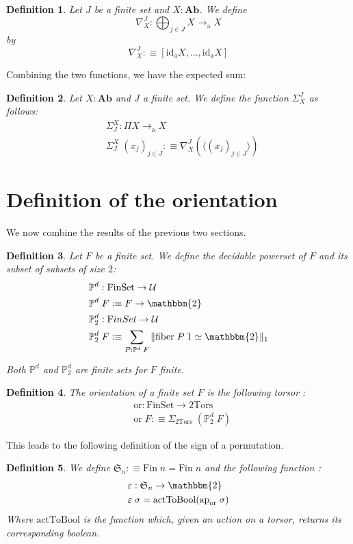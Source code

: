 \documentclass{article}
\newtheorem{defi}{Definition}
\newcommand{\toa}[0]{\to_\mathrm a}
\newcommand{\btwo}[0]{\mathbbm{2}}
\newcommand{\twotors}[0]{2\mathrm{Tors}}
\newcommand{\idd}[0]{\mathrm{id}}
\begin{document}
\begin{defi}
    Let $J$ be a finite set and $X : \textbf{Ab}$. We define $$\nabla^J_X : \bigoplus_{j\in J} X \toa X$$ by
    $$\nabla^J_X :\equiv [\idd_\mathrm a X,\ldots,\idd_\mathrm a X]$$
\end{defi}

Combining the two functions, we have the expected sum:

\begin{defi}
    Let $X : \textbf{Ab}$ and $J$ a finite set. We define the function $\Sigma^J_X$ as follows:
    \begin{align*}
        &\Sigma_J^X : \Pi X \toa X\\
        &\Sigma_J^X\;(x_j)_{j\in J} :\equiv \nabla^J_X (\langle (x_j)_{j\in J}\rangle)
    \end{align*}
\end{defi}

\section{Definition of the orientation}

We now combine the results of the previous two sections.

\begin{defi}
    Let $F$ be a finite set. We define the decidable powerset of $F$ and its subset of subsets of size $2$:
    \begin{align*}
        &\mathbb P^d : \mathrm{FinSet} \to \mathcal U\\
        &\mathbb P^d\;F :\equiv F \to \btwo\\
        &\mathbb P^d_2 : \mathrm FinSet \to \mathcal U\\
        &\mathbb P^d_2\;F :\equiv \sum_{P : \mathbb P^d\;F} \| \mathrm{fiber}\;P\;1 \simeq \btwo\|_1
    \end{align*}

    Both $\mathbb P^d$ and $\mathbb P^d_2$ are finite sets for $F$ finite.
\end{defi}

\begin{defi}
    The orientation of a finite set $F$ is the following torsor :
    \begin{align*}
        &\mathrm{or} : \mathrm{FinSet} \to \twotors\\
        &\mathrm{or}\;F :\equiv \Sigma_{\twotors}\;(\mathbb P^d_2\;F)
    \end{align*}
\end{defi}

This leads to the following definition of the sign of a permutation.

\begin{defi}
    We define $\mathfrak S_n :\equiv \mathrm{Fin}\;n = \mathrm{Fin}\;n$ and the following function :
    \begin{align*}
        &\varepsilon : \mathfrak S_n \to \btwo\\
        &\varepsilon\;\sigma = \mathrm{actToBool}(\mathrm{ap}_{\mathrm{or}}\;\sigma)
    \end{align*}
    Where $\mathrm{actToBool}$ is the function which, given an action on a torsor, returns its corresponding
    boolean.
\end{defi}
\end{document}
